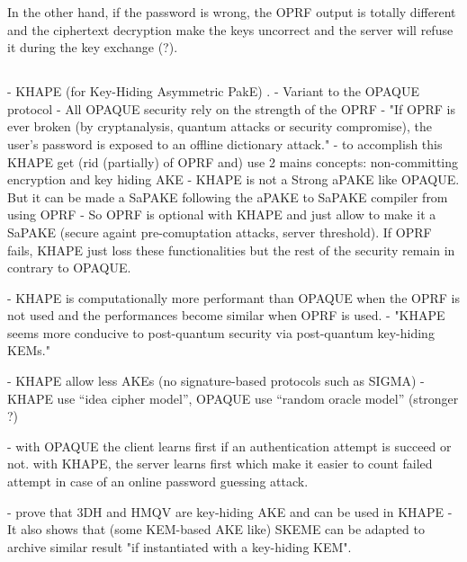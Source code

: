 \documentclass[../report.tex]{subfiles}
\begin{document}
In the other hand, if the password is wrong, the OPRF output is totally different and the ciphertext decryption make the keys uncorrect and the server will refuse it during the key exchange (?). %






\subsection{}

- KHAPE (for Key-Hiding Asymmetric PakE) \cite{KHAPE_Paper}.
- Variant to the OPAQUE protocol
- All OPAQUE security rely on the strength of the OPRF
- "If OPRF is ever broken (by cryptanalysis, quantum attacks or security
compromise), the user’s password is exposed to an offline dictionary attack."
- to accomplish this KHAPE get (rid (partially) of OPRF and) use 2 mains concepts: non-committing encryption and key hiding AKE
- KHAPE is not a Strong aPAKE like OPAQUE. But it can be made a SaPAKE following the aPAKE to SaPAKE compiler from \cite{OPAQUE_Paper} using OPRF
- So OPRF is optional with KHAPE and just allow to make it a SaPAKE (secure againt pre-comuptation attacks, server threshold). If OPRF fails, KHAPE just loss these functionalities but the rest of the security remain in contrary to OPAQUE.

- KHAPE is computationally more performant than OPAQUE when the OPRF is not used and the performances become similar when OPRF is used.
- "KHAPE seems more conducive to post-quantum security via post-quantum key-hiding KEMs."

- KHAPE allow less AKEs (no signature-based protocols such as SIGMA)
- KHAPE use ``idea cipher model'', OPAQUE use ``random oracle model'' (stronger ?)

- with OPAQUE the client learns first if an authentication attempt is succeed or not. with KHAPE, the server learns first which make it easier to count failed attempt in case of an online password guessing attack.


- \cite{KHAPE_Paper} prove that 3DH and HMQV are key-hiding AKE and can be used in KHAPE %
- It also shows that (some KEM-based AKE like) SKEME can be adapted to archive similar result "if instantiated with a key-hiding KEM". %
\end{document}
